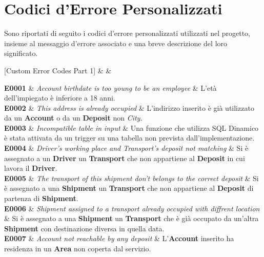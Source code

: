 \chapter{Codici d'Errore Personalizzati}

Sono riportati di seguito i codici d'errore personalizzati utilizzati nel progetto, insieme al messaggio d'errore associato e una breve descrizione del loro significato.

[Custom Error Codes Part 1]{ &  & }{

  \textbf{E0001} &
  {\footnotesize
    \textit{Account birthdate is too young to be an employee} } & 
  {\footnotesize 
    L'età dell'impiegato è inferiore a 18 anni.} \\

  \textbf{E0002} &
  {\footnotesize
    \textit{This address is already occupied} } &
  {\footnotesize
    L'indirizzo inserito è già utilizzato da un \textbf{Account} o da un \textbf{Deposit} non \textit{City}.} \\

  \textbf{E0003} &
  {\footnotesize
    \textit{Incompatible table in input} } &
  {\footnotesize
    Una funzione che utilizza SQL Dinamico è stata attivata da un trigger su una tabella non prevista dall'implementazione.} \\

  \textbf{E0004} &
  {\footnotesize
    \textit{Driver's working place and Transport's deposit not matching} } &
  {\footnotesize 
    Si è assegnato a un \textbf{Driver} un \textbf{Transport} che non appartiene al \textbf{Deposit} in cui lavora il \textbf{Driver}.} \\

  \textbf{E0005} &
  {\footnotesize
    \textit{The transport of this shipment don't belongs to the correct deposit} } &
  {\footnotesize 
    Si è assegnato a una \textbf{Shipment} un \textbf{Transport} che non appartiene al \textbf{Deposit} di partenza di \textbf{Shipment}.} \\

  \textbf{E0006} &
  {\footnotesize
    \textit{Shipment assigned to a transport already occupied with diffrent location} } &
  {\footnotesize
    Si è assegnato a una \textbf{Shipment} un \textbf{Transport} che è già occupato da un'altra \textbf{Shipment} con destinazione diversa in quella data.} \\

  \textbf{E0007} &
  {\footnotesize
    \textit{Account not reachable by any deposit} } &
  {\footnotesize
    L'\textbf{Account} inserito ha residenza in un \textbf{Area} non coperta dal servizio.} \\

}
